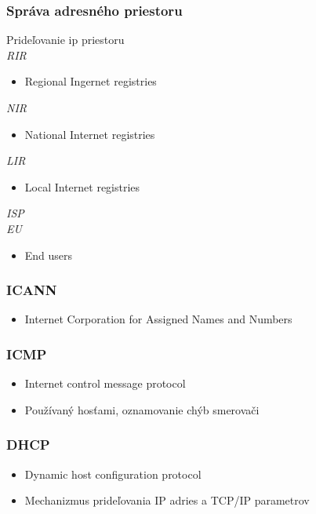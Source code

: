 \documentclass[10pt,xcolor=pdflatex,hyperref={unicode}]{beamer}
\begin{document}
    \begin{frame}
        \frametitle{Správa adresného priestoru}
        Prideľovanie ip priestoru \\
        \emph{RIR}
        \begin{itemize}
            \item Regional Ingernet registries
        \end{itemize}
        \emph{NIR}
        \begin{itemize}
            \item National Internet registries
        \end{itemize}
        \emph{LIR}
        \begin{itemize}
            \item Local Internet registries
        \end{itemize}
        \emph{ISP} \\
        \emph{EU}
        \begin{itemize}
            \item End users
        \end{itemize}
    \end{frame}

    \begin{frame}
        \frametitle{ICANN}
        \begin{itemize}
            \item Internet Corporation for Assigned Names and Numbers
        \end{itemize}
    \end{frame}

    \begin{frame}
        \frametitle{ICMP}
        \begin{itemize}
            \item Internet control message protocol
            \item Používaný hosťami, oznamovanie chýb smerovači
        \end{itemize}
    \end{frame}

    \begin{frame}
        \frametitle{DHCP}
        \begin{itemize}
            \item Dynamic host configuration protocol
            \item Mechanizmus prideľovania IP adries a TCP/IP parametrov
        \end{itemize}

    \end{frame}
\end{document}
